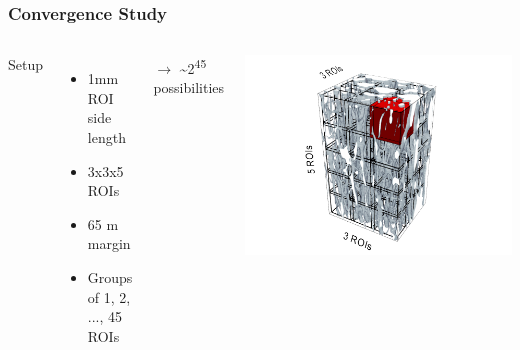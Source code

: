 \documentclass[xcolor=table,11pt]{beamer}
\begin{document}
	\begin{frame}
		\frametitle{Convergence Study}

		\begin{columns}
			\vfill

			Setup
			\begin{itemize}
				\item 1mm ROI side length
				\item 3x3x5 ROIs
				\item 65 \textmu m margin
				\item Groups of 1, 2, ..., 45 ROIs
			\end{itemize}
			$\rightarrow$ \textasciitilde 2\textsuperscript{45} possibilities
			\vfill

			\includegraphics[width=\linewidth, trim=200 0 0 0]{03_ConvergenceStudy/Results/ROIs}\\

		\end{columns}

	\end{frame}
\end{document}
